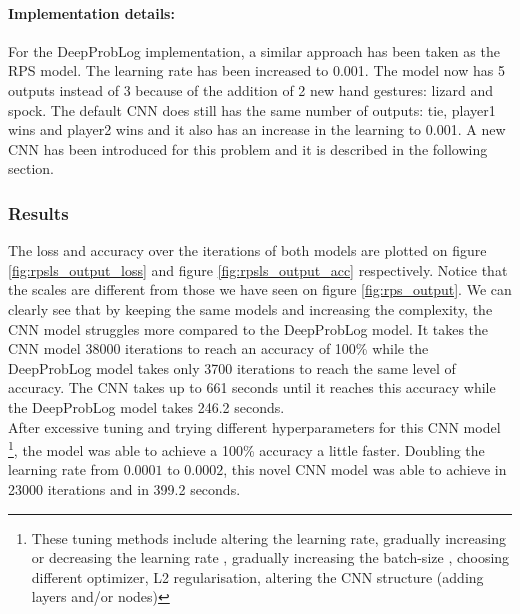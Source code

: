\paragraph{Implementation details:} For the DeepProbLog implementation, a similar approach has been taken as the RPS model. The learning rate has been increased to 0.001. The model now has 5 outputs instead of 3 because of the addition of 2 new hand gestures: lizard and spock. The default CNN does still has the same number of outputs: tie, player1 wins and player2 wins and it also has an increase in the learning to 0.001. A new CNN has been introduced for this problem and it is described in the following section.

\subsubsection{Results}
The loss and accuracy over the iterations of both models are plotted on figure \ref{fig:rpsls_output_loss} and figure \ref{fig:rpsls_output_acc} respectively. Notice that the scales are different from those we have seen on figure \ref{fig:rps_output}. We can clearly see that by keeping the same models and increasing the complexity, the CNN model struggles more compared to the DeepProbLog model. It takes the CNN model 38000 iterations to reach an accuracy of 100\% while the DeepProbLog model takes only 3700 iterations to reach the same level of accuracy. The CNN takes up to 661 seconds until it reaches this accuracy while the DeepProbLog model takes 246.2 seconds.
\\
After excessive tuning and trying different hyperparameters for this CNN model \footnote{These tuning methods include altering the learning rate, gradually increasing or decreasing the learning rate \cite{lr-decay}, gradually increasing the batch-size \cite{increase-batch}, choosing different optimizer, L2 regularisation, altering the CNN structure (adding layers and/or nodes)}, the model was able to achieve a 100\% accuracy a little faster.  Doubling the learning rate from $0.0001$ to $0.0002$, this novel CNN model was able to achieve in 23000 iterations and in 399.2 seconds. 

